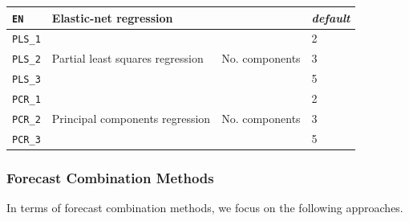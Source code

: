 \documentclass[smallcondensed]{svjour3}
\begin{document}
\begin{table}[!bth]
{\begin{tabular}{llll}
	    
	    \midrule 
        
        \texttt{EN} & Elastic-net regression &  & \textit{default} \\
        
        \midrule   
        
        \texttt{PLS\_1} & \multirow{3}{*}{Partial least squares regression} & \multirow{3}{*}{No. components} & 2 \\
        
        \texttt{PLS\_2} & & & 3 \\
        
        \texttt{PLS\_3} & & & 5 \\
        
        \midrule   
        
        \texttt{PCR\_1} & \multirow{3}{*}{Principal components regression} & \multirow{3}{*}{No. components} & 2 \\
        
        \texttt{PCR\_2} & & & 3 \\
        
        \texttt{PCR\_3} & & & 5 \\
        
		\bottomrule    
	\end{tabular}%
	}
	\label{tab:expertsspecs}
\end{table}



\subsubsection{Forecast Combination Methods}\label{sec:combs}

In terms of forecast combination methods, we focus on the following approaches.
\end{document}
